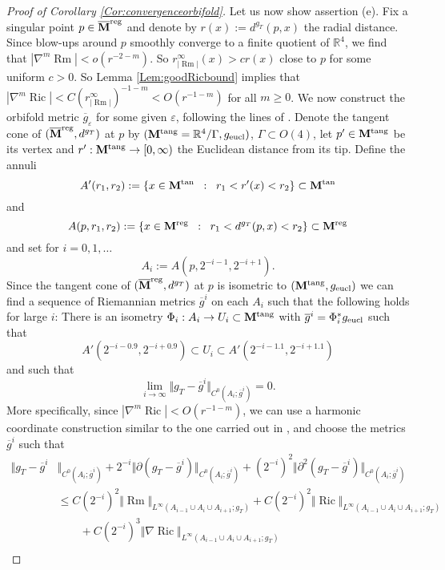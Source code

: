 \documentclass[11pt]{amsart}
\numberwithin{equation}{section}
\newcommand{\IR}{\mathbb{R}}
\def\eps{\varepsilon}
\def\M{{\bf M}}
\def\eps{\varepsilon}
\DeclareMathOperator{\Ric}{Ric}
\DeclareMathOperator{\Rm}{Rm}
\newcommand{\rrm}{r_{|{\Rm}|}}
\numberwithin{equation}{section}
\begin{document}
\begin{proof}[Proof of Corollary \ref{Cor:convergenceorbifold}]
Let us now show assertion (e).
Fix a singular point $p \in \overline{\M}^{\textnormal{reg}}$ and denote by $r(x) := d^{g_T} (p, x)$ the radial distance.
Since blow-ups around $p$ smoothly converge to a finite quotient of $\IR^4$, we find that $|\nabla^m {\Rm}| < o(r^{-2-m})$.
So $\rrm^\infty (x) > c r(x)$ close to $p$ for some uniform $c > 0$.
So Lemma \ref{Lem:goodRicbound} implies that $|\nabla^m {\Ric}| < C( \rrm^\infty)^{-1-m} < O(r^{-1-m})$ for all $m \geq 0$.
We now construct the orbifold metric $\overline{g}_\eps$ for some given $\eps$, following the lines of \cite{BKN}.
Denote the tangent cone of $(\overline{\M}^{\textnormal{reg}}, d^{g_T})$ at $p$ by $(\M^{\textnormal{tang}} = \IR^4 / \Gamma, g_{\textnormal{eucl}})$, $\Gamma \subset O(4)$, let $p' \in \M^{\textnormal{tang}}$ be its vertex and $r' : \M^{\textnormal{tang}} \to [0, \infty)$ the Euclidean distance from its tip.
Define the annuli
\[ A' (r_1, r_2) := \{ x \in \M^{\textnormal{tan}} \;\; : \;\; r_1 < r'(x) < r_2 \} \subset \M^{\textnormal{tan}} \]
and
\[ A (p, r_1, r_2) := \{ x \in \M^{\textnormal{reg}} \;\; : \;\; r_1 < d^{g_T} (p, x) < r_2 \} \subset \M^{\textnormal{reg}}  \]
and set for $i = 0, 1, \ldots$
\[ A_i := A(p, 2^{-i-1}, 2^{-i+1}). \]
Since the tangent cone of $(\overline{\M}^{\textnormal{reg}}, d^{g_T})$ at $p$ is isometric to $(\M^{\textnormal{tang}}, g_{\textnormal{eucl}})$ we can find a sequence of Riemannian metrics $\overline{g}^i$ on each $A_i$ such that the following holds for large $i$:
There is an isometry $\Phi_i : A_i \to U_i \subset \M^{\textnormal{tang}}$ with $\overline{g}^i = \Phi_i^* g_{\textnormal{eucl}}$ such that
\[ A' (2^{-i-0.9}, 2^{-i+0.9} ) \subset U_i \subset A' (2^{-i-1.1}, 2^{-i+1.1}) \]
and such that
\[ \lim_{i \to \infty} \Vert g_T - \overline{g}^i \Vert_{C^0 (A_i; \overline{g}^i)} = 0. \]
More specifically, since $|\nabla^m {\Ric}| < O(r^{-1-m})$, we can use a harmonic coordinate construction similar to the one carried out in \cite{BKN}, and choose the metrics $\overline{g}^i$ such that
\begin{align*}
 \Vert g_T - \overline{g}^i & \Vert_{C^0 (A_i; \overline{g}^i)} + 2^{-i} \Vert  \partial (g_T - \overline{g}^i) \Vert_{C^0 (A_i; \overline{g}^i)}  + (2^{-i} )^2 \Vert \partial^2(g_T - \overline{g}^i) \Vert_{C^0 (A_i; \overline{g}^i)}  \\
& \leq C (2^{-i})^2 \Vert {\Rm} \Vert_{L^\infty (A_{i-1} \cup A_i \cup A_{i+1}; g_T)} 
 + C (2^{-i})^2 \Vert  {\Ric} \Vert_{L^\infty (A_{i-1} \cup A_i \cup A_{i+1}; g_T)} \\
 &\qquad +  C (2^{-i})^3 \Vert  \nabla {\Ric} \Vert_{L^\infty (A_{i-1} \cup A_i \cup A_{i+1}; g_T)} \\

\end{align*}
\end{proof}
\end{document}
